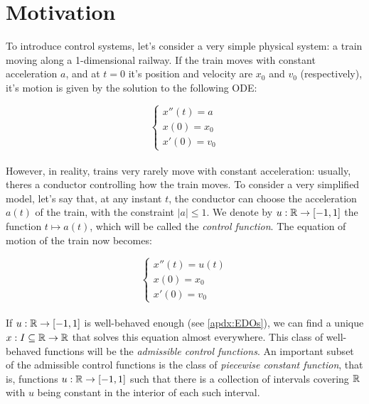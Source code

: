 \section{Motivation}

To introduce control systems, let's consider a very simple physical system:
a train moving along a 1-dimensional railway. If the train moves with
constant acceleration $a$, and at $t=0$ it's position and velocity
are $x_0$ and $v_0$ (respectively), it's motion is given by the solution
to the following ODE:

\begin{equation}
    \label{eq:train_cte}
    \begin{cases}
        x''(t) = a\\
        x(0) = x_0\\
        x'(0) = v_0
    \end{cases}
\end{equation}
\\

However, in reality, trains very rarely move with constant acceleration: usually,
theres a conductor controlling how the train moves. To consider a very simplified
model, let's say that, at any instant $t$, the conductor can choose
the acceleration $a(t)$ of the train, with the constraint $|a|\leq 1$.
We denote by $u: \mathbb{R} \to [-1,1]$
the function $t \mapsto a(t)$, which will be called the \textit{control function}.
The equation
of motion of the train now becomes:

\begin{equation}
    \label{eq:train_ctrl}
    \begin{cases}
        x''(t) = u(t)\\
        x(0) = x_0\\
        x'(0) = v_0
    \end{cases}
\end{equation}
\\

If $u: \mathbb{R} \to [-1,1]$ is well-behaved enough (see \autoref{apdx:EDOs}),
we can find a unique $x : I \subseteq \mathbb{R} \to \mathbb{R}$ that solves
this equation almost everywhere. This class of well-behaved
functions will be the \textit{admissible control functions}.
An important subset of the admissible control functions is the
class of \textit{piecewise constant function}, that is, functions
$u: \mathbb{R} \to [-1,1]$ such that there is a collection of intervals
covering $\mathbb{R}$ with $u$ being constant in the interior of each such interval.

